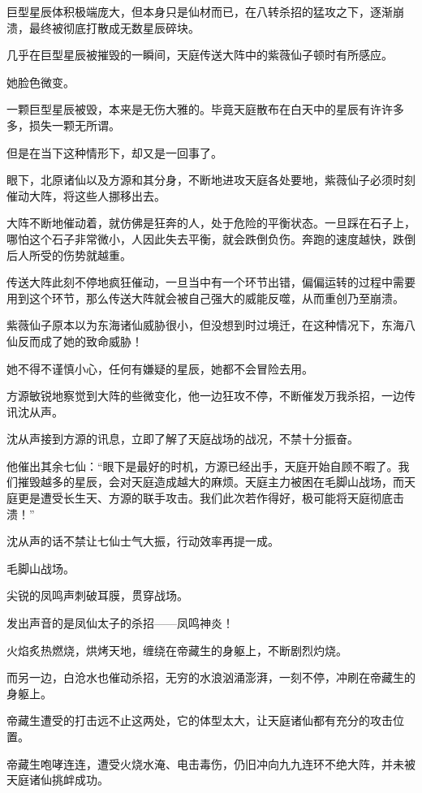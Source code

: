 \begin{this_body}
巨型星辰体积极端庞大，但本身只是仙材而已，在八转杀招的猛攻之下，逐渐崩溃，最终被彻底打散成无数星辰碎块。

几乎在巨型星辰被摧毁的一瞬间，天庭传送大阵中的紫薇仙子顿时有所感应。

她脸色微变。

一颗巨型星辰被毁，本来是无伤大雅的。毕竟天庭散布在白天中的星辰有许许多多，损失一颗无所谓。

但是在当下这种情形下，却又是一回事了。

眼下，北原诸仙以及方源和其分身，不断地进攻天庭各处要地，紫薇仙子必须时刻催动大阵，将这些人挪移出去。

大阵不断地催动着，就仿佛是狂奔的人，处于危险的平衡状态。一旦踩在石子上，哪怕这个石子非常微小，人因此失去平衡，就会跌倒负伤。奔跑的速度越快，跌倒后人所受的伤势就越重。

传送大阵此刻不停地疯狂催动，一旦当中有一个环节出错，偏偏运转的过程中需要用到这个环节，那么传送大阵就会被自己强大的威能反噬，从而重创乃至崩溃。

紫薇仙子原本以为东海诸仙威胁很小，但没想到时过境迁，在这种情况下，东海八仙反而成了她的致命威胁！

她不得不谨慎小心，任何有嫌疑的星辰，她都不会冒险去用。

方源敏锐地察觉到大阵的些微变化，他一边狂攻不停，不断催发万我杀招，一边传讯沈从声。

沈从声接到方源的讯息，立即了解了天庭战场的战况，不禁十分振奋。

他催出其余七仙：“眼下是最好的时机，方源已经出手，天庭开始自顾不暇了。我们摧毁越多的星辰，会对天庭造成越大的麻烦。天庭主力被困在毛脚山战场，而天庭更是遭受长生天、方源的联手攻击。我们此次若作得好，极可能将天庭彻底击溃！”

沈从声的话不禁让七仙士气大振，行动效率再提一成。

毛脚山战场。

尖锐的凤鸣声刺破耳膜，贯穿战场。

发出声音的是凤仙太子的杀招——凤鸣神炎！

火焰炙热燃烧，烘烤天地，缠绕在帝藏生的身躯上，不断剧烈灼烧。

而另一边，白沧水也催动杀招，无穷的水浪汹涌澎湃，一刻不停，冲刷在帝藏生的身躯上。

帝藏生遭受的打击远不止这两处，它的体型太大，让天庭诸仙都有充分的攻击位置。

帝藏生咆哮连连，遭受火烧水淹、电击毒伤，仍旧冲向九九连环不绝大阵，并未被天庭诸仙挑衅成功。


\end{this_body}
